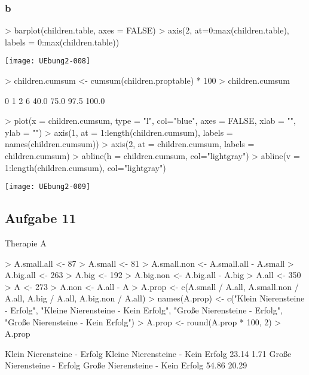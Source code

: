 \documentclass{article}
\begin{document}
\subsubsection{b}

\begin{Schunk}
\begin{Sinput}
> barplot(children.table, axes = FALSE)
> axis(2, at=0:max(children.table), labels = 0:max(children.table))
\end{Sinput}
\end{Schunk}
\texttt{[image: UEbung2-008]}

\begin{Schunk}
\begin{Sinput}
> children.cumsum <- cumsum(children.proptable) * 100
> children.cumsum
\end{Sinput}
\begin{Soutput}
    0     1     2     6 
 40.0  75.0  97.5 100.0 
\end{Soutput}
\begin{Sinput}
> plot(x = children.cumsum, type = "l", col="blue", axes = FALSE, xlab = "", ylab = "")
> axis(1, at = 1:length(children.cumsum), labels = names(children.cumsum))
> axis(2, at = children.cumsum, labels = children.cumsum)
> abline(h = children.cumsum, col="lightgray")
> abline(v = 1:length(children.cumsum), col="lightgray")
\end{Sinput}
\end{Schunk}
\texttt{[image: UEbung2-009]}

\subsection{Aufgabe 11}

Therapie A

\begin{Schunk}
\begin{Sinput}
> A.small.all <- 87
> A.small <- 81
> A.small.non <- A.small.all - A.small
> A.big.all <- 263
> A.big <- 192
> A.big.non <- A.big.all - A.big
> A.all <- 350
> A <- 273
> A.non <- A.all - A
> A.prop <- c(A.small / A.all, A.small.non / A.all, A.big / A.all, A.big.non / A.all)
> names(A.prop) <- c("Klein Nierensteine - Erfolg", "Kleine Nierensteine - Kein Erfolg", "Große Nierensteine - Erfolg", "Große Nierensteine - Kein Erfolg")
> A.prop <- round(A.prop * 100, 2)
> A.prop
\end{Sinput}
\begin{Soutput}
      Klein Nierensteine - Erfolg Kleine Nierensteine - Kein Erfolg 
                            23.14                              1.71 
      Große Nierensteine - Erfolg  Große Nierensteine - Kein Erfolg 
                            54.86                             20.29 
\end{Soutput}
\end{Schunk}
\end{document}
